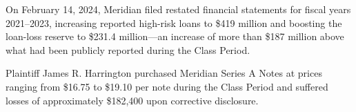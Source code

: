 \documentclass[12pt,letterpaper]{article}
\begin{document}
\begin{factlist}
\item On February 14, 2024, Meridian filed restated financial statements for fiscal years 2021--2023, increasing reported high-risk loans to \$419 million and boosting the loan-loss reserve to \$231.4 million---an increase of more than \$187 million above what had been publicly reported during the Class Period.

\item Plaintiff James R. Harrington purchased Meridian Series A Notes at prices ranging from \$16.75 to \$19.10 per note during the Class Period and suffered losses of approximately \$182,400 upon corrective disclosure.

\end{factlist}





\end{document}
